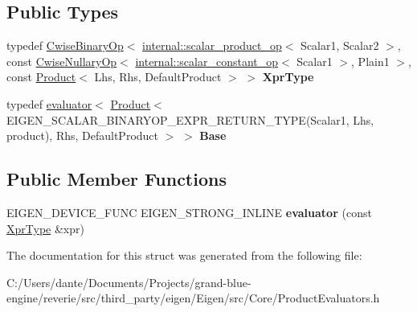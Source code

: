 \subsection*{Public Types}
\begin{DoxyCompactItemize}
\item 
\mbox{\label{struct_eigen_1_1internal_1_1evaluator_3_01_cwise_binary_op_3_01internal_1_1scalar__product__op_321f22566d2663743c7f9d1c3e4e03f69_a518128307c011806fa4f530d8d1c7a96}} 
typedef \mbox{\hyperlink{class_eigen_1_1_cwise_binary_op}{Cwise\+Binary\+Op}}$<$ \mbox{\hyperlink{struct_eigen_1_1internal_1_1scalar__product__op}{internal\+::scalar\+\_\+product\+\_\+op}}$<$ Scalar1, Scalar2 $>$, const \mbox{\hyperlink{class_eigen_1_1_cwise_nullary_op}{Cwise\+Nullary\+Op}}$<$ \mbox{\hyperlink{struct_eigen_1_1internal_1_1scalar__constant__op}{internal\+::scalar\+\_\+constant\+\_\+op}}$<$ Scalar1 $>$, Plain1 $>$, const \mbox{\hyperlink{class_eigen_1_1_product}{Product}}$<$ Lhs, Rhs, Default\+Product $>$ $>$ {\bfseries Xpr\+Type}
\item 
\mbox{\label{struct_eigen_1_1internal_1_1evaluator_3_01_cwise_binary_op_3_01internal_1_1scalar__product__op_321f22566d2663743c7f9d1c3e4e03f69_a9626a0e1d13b8213c27d2a4988280ac3}} 
typedef \mbox{\hyperlink{struct_eigen_1_1internal_1_1evaluator}{evaluator}}$<$ \mbox{\hyperlink{class_eigen_1_1_product}{Product}}$<$ E\+I\+G\+E\+N\+\_\+\+S\+C\+A\+L\+A\+R\+\_\+\+B\+I\+N\+A\+R\+Y\+O\+P\+\_\+\+E\+X\+P\+R\+\_\+\+R\+E\+T\+U\+R\+N\+\_\+\+T\+Y\+PE(Scalar1, Lhs, product), Rhs, Default\+Product $>$ $>$ {\bfseries Base}
\end{DoxyCompactItemize}
\subsection*{Public Member Functions}
\begin{DoxyCompactItemize}
\item 
\mbox{\label{struct_eigen_1_1internal_1_1evaluator_3_01_cwise_binary_op_3_01internal_1_1scalar__product__op_321f22566d2663743c7f9d1c3e4e03f69_a91fff37a094006ba218ce42cdb7cb3d8}} 
E\+I\+G\+E\+N\+\_\+\+D\+E\+V\+I\+C\+E\+\_\+\+F\+U\+NC E\+I\+G\+E\+N\+\_\+\+S\+T\+R\+O\+N\+G\+\_\+\+I\+N\+L\+I\+NE {\bfseries evaluator} (const \mbox{\hyperlink{class_eigen_1_1_cwise_binary_op}{Xpr\+Type}} \&xpr)
\end{DoxyCompactItemize}


The documentation for this struct was generated from the following file\+:\begin{DoxyCompactItemize}
\item 
C\+:/\+Users/dante/\+Documents/\+Projects/grand-\/blue-\/engine/reverie/src/third\+\_\+party/eigen/\+Eigen/src/\+Core/Product\+Evaluators.\+h\end{DoxyCompactItemize}
